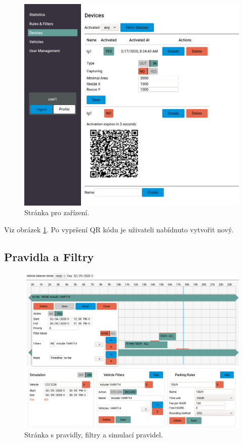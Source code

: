 \begin{figure} \centering
  \includegraphics[width=145mm]{../img/page_devices.png}
  \caption{Stránka pro zařízení.}
  \label{fig:page_devices}
\end{figure}

\noindent
Viz obrázek \ref{fig:page_devices}.
Po vypršení QR kódu je uživateli nabídnuto vytvořit nový.

\subsection*{Pravidla a Filtry}

\begin{figure} \centering
  \includegraphics[width=145mm]{../img/page_rules.png}
  \caption{Stránka s pravidly, filtry a simulací pravidel.}
  \label{fig:page_rules}
\end{figure}

